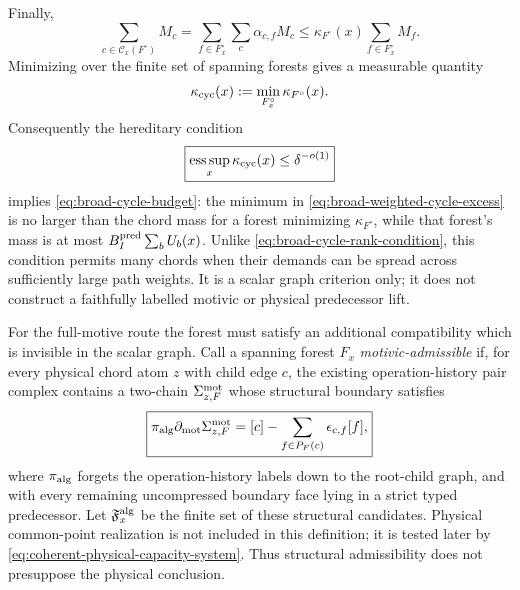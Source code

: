 \documentclass[11pt]{article}
\begin{document}
Finally,
\[
 \sum_{c\in\mathcal C_x(F^\circ)}M_c
 =\sum_{f\in F_x^\circ}
   \sum_c\alpha_{c,f}M_c
 \le\kappa_{F^\circ}(x)\sum_{f\in F_x^\circ}M_f.
\]
Minimizing over the finite set of spanning forests gives a measurable
quantity
\[
 \kappa_{\rm cyc}(x):=\min_{F_x^\circ}\kappa_{F^\circ}(x).
\]
Consequently the hereditary condition
\begin{equation}\label{eq:fundamental-cycle-congestion-bound}
 \boxed{
 \operatorname*{ess\,sup}_x\kappa_{\rm cyc}(x)
 \le\delta^{-o(1)}}
\end{equation}
implies \eqref{eq:broad-cycle-budget}: the minimum in
\eqref{eq:broad-weighted-cycle-excess} is no larger than the chord mass for a
forest minimizing \(\kappa_{F^\circ}\), while that forest's mass is at most
\(B_I^{\rm pred}\sum_bU_b(x)\).  Unlike
\eqref{eq:broad-cycle-rank-condition}, this condition permits many chords
when their demands can be spread across sufficiently large path weights.  It
is a scalar graph criterion only; it does not construct a faithfully labelled
motivic or physical predecessor lift.

For the full-motive route the forest must satisfy an additional compatibility
which is invisible in the scalar graph.  Call a spanning forest \(F_x\)
\emph{motivic-admissible} if, for every physical chord atom \(z\) with child
edge \(c\), the existing operation-history pair complex contains a two-chain
\(\Sigma_{z,F}^{\rm mot}\) whose structural boundary satisfies
\begin{equation}\label{eq:motivic-admissible-forest}
 \boxed{
 \pi_{\rm alg}\partial_{\rm mot}\Sigma_{z,F}^{\rm mot}
 =
 [c]-\sum_{f\in P_F(c)}\epsilon_{c,f}[f],}
\end{equation}
where \(\pi_{\rm alg}\) forgets the operation-history labels down to the
root-child graph, and with every remaining uncompressed boundary face lying
in a strict typed predecessor.  Let \(\mathfrak F_x^{\rm alg}\) be the finite
set of these structural candidates.  Physical common-point realization is
not included in this definition; it is tested later by
\eqref{eq:coherent-physical-capacity-system}.  Thus structural admissibility
does not presuppose the physical conclusion.
\end{document}
